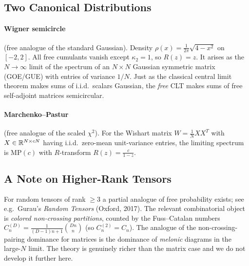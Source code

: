 \subsection{Two Canonical Distributions}

\paragraph{Wigner semicircle} (free analogue of the standard Gaussian). Density
\(
   \rho(x) = \frac{1}{2\pi}\sqrt{4 - x^2}
\)
on $[-2, 2]$. All free cumulants vanish except $\kappa_2 = 1$, so $R(z) = z$. It arises as the $N\to\infty$ limit of the spectrum of an $N\times N$ Gaussian symmetric matrix (GOE/GUE) with entries of variance $1/N$. Just as the classical central limit theorem makes sums of i.i.d.\ scalars Gaussian, the \emph{free} CLT makes sums of free self-adjoint matrices semicircular.

\paragraph{Marchenko--Pastur} (free analogue of the scaled $\chi^2$). For the Wishart matrix $W = \frac{1}{N} X X^T$ with $X \in \mathbb R^{N \times cN}$ having i.i.d.\ zero-mean unit-variance entries, the limiting spectrum is $\mathrm{MP}(c)$ with $R$-transform
\(
   R(z) = \frac{c}{1 - z}.
\)

\subsection{A Note on Higher-Rank Tensors}

For random tensors of rank $\ge 3$ a partial analogue of free probability exists; see e.g.\ Gurau's \emph{Random Tensors} (Oxford, 2017). The relevant combinatorial object is \emph{colored non-crossing partitions}, counted by the Fuss--Catalan numbers $C_n^{(D)} = \frac{1}{(D-1)n + 1}\binom{Dn}{n}$ (so $C_n^{(2)} = C_n$). The analogue of the non-crossing-pairing dominance for matrices is the dominance of \emph{melonic} diagrams in the large-$N$ limit. The theory is genuinely richer than the matrix case and we do not develop it further here.


